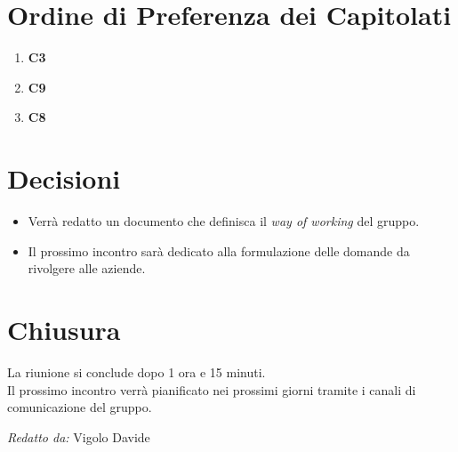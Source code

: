 \documentclass[a4paper,12pt]{article}
\begin{document}
\vspace{0.5cm}
\section*{Ordine di Preferenza dei Capitolati}

\begin{enumerate}
    \item \textbf{C3}
    \item \textbf{C9}
    \item \textbf{C8}
\end{enumerate}

\vspace{0.5cm}
\section*{Decisioni}
\begin{itemize}
    \item Verrà redatto un documento che definisca il \textit{way of working} del gruppo.
    \item Il prossimo incontro sarà dedicato alla formulazione delle domande da rivolgere alle aziende.
\end{itemize}

\vspace{0.5cm}
\section*{Chiusura}
La riunione si conclude dopo 1 ora e 15 minuti. \\
Il prossimo incontro verrà pianificato nei prossimi giorni tramite i canali di comunicazione del gruppo.

\vfill
\begin{flushright}
    \textit{Redatto da:} Vigolo Davide
\end{flushright}
\end{document}
